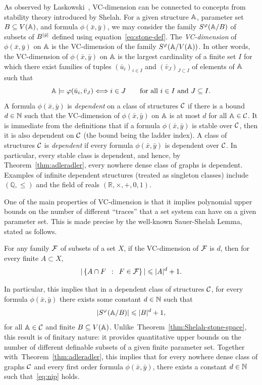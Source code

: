 As observed by Laskowski~\cite{laskowski1992vapnik}, VC-dimension can be connected to concepts from stability theory introduced by Shelah.
For a given structure $\str A$, parameter set $B\subseteq V(\str A)$, and formula $\phi(\bar x,\bar y)$,
we may consider the family $S^\phi(\str A/B)$ of subsets of $B^{|\tup y|}$ defined using equation~\eqref{eq:stone-def}.
The \emph{VC-dimension} of $\phi(\bar x,\bar y)$ on $\str A$ is the VC-dimension of the family $S^\phi(\str A/V(\str A))$. 
In other words, the VC-dimension of $\phi(\bar x,\bar y)$
on $\str A$ is the largest cardinality of a finite
set $I$ for which there exist families of tuples $(\bar u_i)_{i\in I}$ and $(\bar v_J)_{J\subset I}$
of elements of $\str A$
such that  $$\strA\models\phi(\tup{u}_i,\tup{v}_J)\Longleftrightarrow i\in J\qquad \text {for all $i\in I$ and $J\subset I$.}$$
A formula $\phi(\bar x,\bar y)$ is \emph{dependent} on a class of structures $\cal C$
if there is a bound $d\in\N$ such that the VC-dimension of $\phi(\bar x,\bar y)$ on $\str A$ is at most $d$ for all $\str A\in\cal C$.
It is immediate from the definitions  that if a formula $\phi(\bar x,\bar y)$ is stable over $\cal C$, then it is also dependent on $\cal C$ (the bound being the ladder index). 
A class of structures  $\cal C$ is {\em{dependent}} if every formula $\phi(\bar x,\bar y)$ is dependent over $\cal C$. 
In particular, every stable class is dependent, and hence, by Theorem~\ref{thm:adleradler}, every nowhere dense class of graphs is dependent.
Examples of infinite dependent structures (treated as singleton classes) include 
$(\mathbb Q,\le )$ and the field of reals $(\mathbb R,\times,+,0,1)$. 

One of the main properties of VC-dimension is that it implies polynomial upper bounds on the number of different ``traces'' that a set system can have on a given parameter set.
This is made precise by the well-known Sauer-Shelah Lemma, stated as follows.
\begin{theorem}\label{thm:sauer-shelah}
  For any family $\FFF$ of subsets of a set $X$, if the VC-dimension of $\FFF$ is $d$,
  then for every finite $A\subset X$,
$$|\setof{A\cap F}{F\in {\cal F}}|\le |A|^d+1.$$
\end{theorem}
In particular, this implies that 
in a dependent class of structures $\cal C$, 
for every formula $\phi(\bar x,\bar y)$
there exists some constant $d\in \N$
such that
\begin{equation}\label{eq:nip}
|S^\phi(\str A/B)|\le |B|^d+1,	
\end{equation}
for all $\str A\in\cal C$ and finite $B\subset V(\str A)$.
Unlike~Theorem~\ref{thm:Shelah-stone-space}, this result 
is of finitary nature: it provides quantitative upper bounds on the number of different definable subsets of a given finite parameter set. 
Together with~Theorem~\ref{thm:adleradler}, this implies that for every nowhere dense class of graphs $\cal C$
and every first order formula $\phi(\bar x,\bar y)$,
there exists a constant $d\in\N$ such that~\eqref{eq:nip} holds. 

